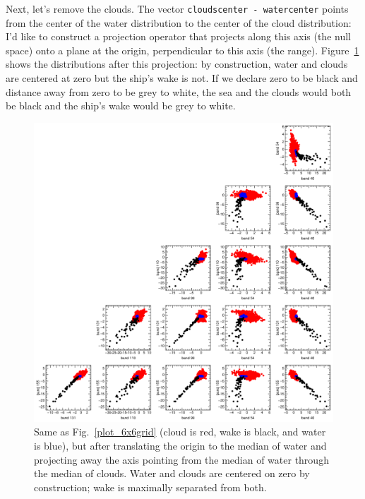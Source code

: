 \documentclass[12pt]{article}
\begin{document}
Next, let's remove the clouds.  The vector {\tt cloudscenter -
  watercenter} points from the center of the water distribution
to the center of the cloud distribution: I'd like to construct a
projection operator that projects along this axis (the null space)
onto a plane at the origin, perpendicular to this axis (the range).
Figure~\ref{plot_6x6grid_cloudsremoved} shows the distributions after
this projection: by construction, water and clouds are centered at
zero but the ship's wake is not.  If we declare zero to be black and
distance away from zero to be grey to white, the sea and the clouds
would both be black and the ship's wake would be grey to white.

\begin{figure}[p]
\begin{center}
\includegraphics[width=\linewidth]{plot_6x6grid_cloudsremoved.png}
\end{center}
\caption{Same as Fig.~\ref{plot_6x6grid} (cloud is red, wake is black,
  and water is blue), but after translating the origin to the median
  of water and projecting away the axis pointing from the median of
  water through the median of clouds.  Water and clouds are
  centered on zero by construction; wake is maximally separated from both.
 \label{plot_6x6grid_cloudsremoved}}
\end{figure}
\end{document}
